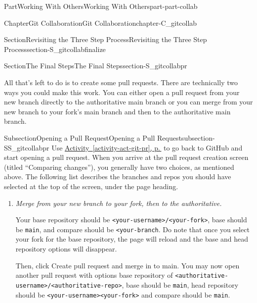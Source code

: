 \documentclass[twoside,10pt,]{book}
\newcommand{\xreffont}{\relax}
\newcommand{\mono}[1]{\texttt{#1}}
\newcommand{\lititle}[1]{{\slshape#1}}
\begin{document}
\begin{partptx}{Part}{Working With Others}{}{Working With Others}{}{}{part-part-collab}
\begin{chapterptx}{Chapter}{Git Collaboration}{}{Git Collaboration}{}{}{chapter-C_gitcollab}
\begin{sectionptx}{Section}{Revisiting the Three Step Process}{}{Revisiting the Three Step Process}{}{}{section-S_gitcollabfinalize}
\begin{conclusion}{}
\end{conclusion}%
\end{sectionptx}
%
%
\typeout{************************************************}
\typeout{************************************************}
%
\begin{sectionptx}{Section}{The Final Steps}{}{The Final Steps}{}{}{section-S_gitcollabpr}
\begin{introduction}{}%
All that's left to do is to create some pull requests. There are technically two ways you could make this work. You can either open a pull request from your new branch directly to the authoritative main branch or you can merge from your new branch to your fork's main branch and then to the authoritative main branch.%
\end{introduction}%
%
%
\typeout{************************************************}
\typeout{************************************************}
%
\begin{subsectionptx}{Subsection}{Opening a Pull Request}{}{Opening a Pull Request}{}{}{subsection-SS_gitcollabpr}
%
%
%
%
%
%
Use \hyperref[activity-act-git-pr]{Activity~{\xreffont\ref{activity-act-git-pr}}, p.\,\pageref{activity-act-git-pr}} to go back to GitHub and start opening a pull request. When you arrive at the pull request creation screen (titled ``Comparing changes''), you generally have two choices, as mentioned above. The following list describes the branches and repos you should have selected at the top of the screen, under the page heading.%
\begin{enumerate}
\item{}\lititle{Merge from your new branch to your fork, then to the authoritative.}\par%
Your base repository should be \mono{<your-username>/<your-fork>}, base should be \mono{main}, and compare should be \mono{<your-branch}. Do note that once you select your fork for the base repository, the page will reload and the base and head repository options will disappear.%
\par
Then, click Create pull request and merge in to main. You may now open another pull request with options base repository of \mono{<authoritative-username>/<authoritative-repo>}, base should be \mono{main}, head repository should be \mono{<your-username><your-fork>} and compare should be \mono{main}.%

\end{enumerate}
\end{subsectionptx}
\end{sectionptx}
\end{chapterptx}
\end{partptx}
\end{document}
